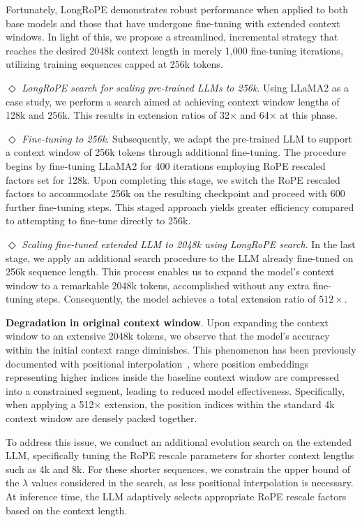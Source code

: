 Fortunately, LongRoPE demonstrates robust performance when applied to both base models and those that have undergone fine-tuning with extended context windows. In light of this, we propose a streamlined, incremental strategy that reaches the desired 2048k context length in merely 1,000 fine-tuning iterations, utilizing training sequences capped at 256k tokens.

$\Diamond$ \textit{LongRoPE search for scaling pre-trained LLMs to 256k}. Using LLaMA2 as a case study, we perform a search aimed at achieving context window lengths of 128k and 256k. This results in extension ratios of 32$\times$ and 64$\times$ at this phase.

$\Diamond$ \textit{Fine-tuning to 256k}. Subsequently, we adapt the pre-trained LLM to support a context window of 256k tokens through additional fine-tuning. The procedure begins by fine-tuning LLaMA2 for 400 iterations employing RoPE rescaled factors set for 128k. Upon completing this stage, we switch the RoPE rescaled factors to accommodate 256k on the resulting checkpoint and proceed with 600 further fine-tuning steps. This staged approach yields greater efficiency compared to attempting to fine-tune directly to 256k.

$\Diamond$ \textit{Scaling fine-tuned extended LLM to 2048k using LongRoPE search}. In the last stage, we apply an additional search procedure to the LLM already fine-tuned on 256k sequence length. This process enables us to expand the model’s context window to a remarkable 2048k tokens, accomplished without any extra fine-tuning steps. Consequently, the model achieves a total extension ratio of $512\times$.

\textbf{Degradation in original context window}. Upon expanding the context window to an extensive 2048k tokens, we observe that the model's accuracy within the initial context range diminishes. This phenomenon has been previously documented with positional interpolation~\cite{pi}, where position embeddings representing higher indices inside the baseline context window are compressed into a constrained segment, leading to reduced model effectiveness. Specifically, when applying a 512$\times$ extension, the position indices within the standard 4k context window are densely packed together.

To address this issue, we conduct an additional evolution search on the extended LLM, specifically tuning the RoPE rescale parameters for shorter context lengths such as 4k and 8k. For these shorter sequences, we constrain the upper bound of the $\lambda$ values considered in the search, as less positional interpolation is necessary. At inference time, the LLM adaptively selects appropriate RoPE rescale factors based on the context length.

